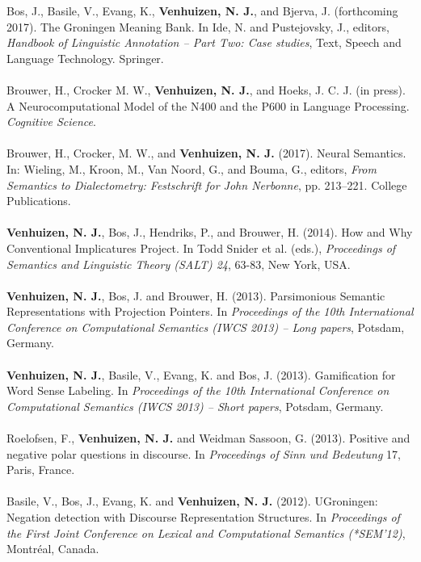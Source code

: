 \documentclass[a4paper,10pt]{article}
\begin{document}
\noindent
    Bos, J., Basile, V., Evang, K., \textbf{Venhuizen, N. J.}, and Bjerva, J.
    (forthcoming 2017). The Groningen Meaning Bank. In Ide, N. and Pustejovsky, J.,
    editors, \textit{Handbook of Linguistic Annotation -- Part Two: Case
    studies}, Text, Speech and Language Technology. Springer.\\
    \\
    Brouwer, H., Crocker M. W., \textbf{Venhuizen, N. J.}, and Hoeks, J. C. J.
    (in press). A Neurocomputational Model of the N400 and the P600 in Language
    Processing. \textit{Cognitive Science}.\\
    \\
    Brouwer, H., Crocker, M. W., and \textbf{Venhuizen, N. J.} (2017). 
    Neural Semantics. In: Wieling, M., Kroon, M., Van Noord, G., and Bouma, G.,
    editors, \textit{From Semantics to Dialectometry: Festschrift for John
    Nerbonne}, pp. 213–221. College Publications.\\
    \\
    \textbf{Venhuizen, N. J.}, Bos, J., Hendriks, P., and Brouwer, H. (2014).
    How and Why Conventional Implicatures Project. In Todd Snider et al.
    (eds.), \textit{Proceedings of Semantics and Linguistic Theory (SALT) 24},
    63-83, New York, USA.\\
    \\
    \textbf{Venhuizen, N. J.}, Bos, J. and Brouwer, H. (2013). Parsimonious 
    Semantic Representations with Projection Pointers. In \textit{Proceedings
    of the 10th International Conference on Computational Semantics (IWCS 2013)
    -- Long papers}, Potsdam, Germany.\\
    \\
    \textbf{Venhuizen, N. J.}, Basile, V., Evang, K. and Bos, J. (2013).
    Gamification for Word Sense Labeling. In \textit{Proceedings of the 10th 
    International Conference on Computational Semantics (IWCS 2013) --
    Short papers}, Potsdam, Germany.\\
    \\
    Roelofsen, F., \textbf{Venhuizen, N. J.} and Weidman Sassoon, G. (2013).
    Positive and negative polar questions in discourse. In \textit{Proceedings of
    Sinn und Bedeutung} 17, Paris, France.\\
    \\
    Basile, V., Bos, J., Evang, K. and \textbf{Venhuizen, N. J.} (2012). UGroningen:
    Negation detection with Discourse Representation Structures. In
    \textit{Proceedings of the First Joint Conference on Lexical and Computational
    Semantics (*SEM'12)}, Montr\'eal, Canada.\\
\end{document}
